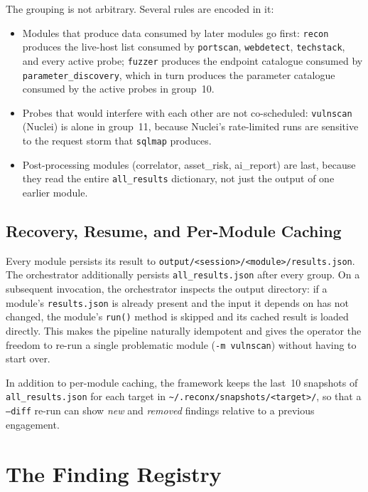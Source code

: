 The grouping is not arbitrary. Several rules are encoded in it:

\begin{itemize}
  \item Modules that produce data consumed by later modules go first: \texttt{recon} produces the live-host list consumed by \texttt{portscan}, \texttt{webdetect}, \texttt{techstack}, and every active probe; \texttt{fuzzer} produces the endpoint catalogue consumed by \texttt{parameter\_discovery}, which in turn produces the parameter catalogue consumed by the active probes in group~10.
  \item Probes that would interfere with each other are not co-scheduled: \texttt{vulnscan} (Nuclei) is alone in group~11, because Nuclei's rate-limited runs are sensitive to the request storm that \texttt{sqlmap} produces.
  \item Post-processing modules (correlator, asset\_risk, ai\_report) are last, because they read the entire \texttt{all\_results} dictionary, not just the output of one earlier module.
\end{itemize}

\subsection{Recovery, Resume, and Per-Module Caching}
\label{sec:resume}

Every module persists its result to \texttt{output/<session>/<module>/results.json}. The orchestrator additionally persists \texttt{all\_results.json} after every group. On a subsequent invocation, the orchestrator inspects the output directory: if a module's \texttt{results.json} is already present and the input it depends on has not changed, the module's \texttt{run()} method is skipped and its cached result is loaded directly. This makes the pipeline naturally idempotent and gives the operator the freedom to re-run a single problematic module (\texttt{-m vulnscan}) without having to start over.

In addition to per-module caching, the framework keeps the last~10 snapshots of \texttt{all\_results.json} for each target in \texttt{\textasciitilde/.reconx/snapshots/<target>/}, so that a \texttt{--diff} re-run can show \textit{new} and \textit{removed} findings relative to a previous engagement.

\section{The Finding Registry}
\label{sec:registry}

